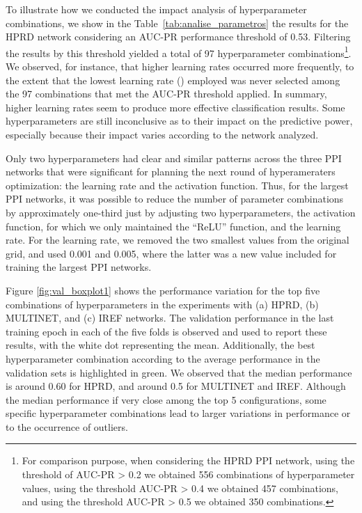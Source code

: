 To illustrate how we conducted the impact analysis of hyperparameter combinations, we show in the  Table~\ref{tab:analise_parametros} the results for the HPRD network considering an AUC-PR performance threshold of 0.53. Filtering the results by this threshold yielded a total of 97 hyperparameter combinations\footnote{For comparison purpose, when considering the HPRD PPI network, using the threshold of AUC-PR > 0.2 we obtained 556 combinations of hyperparameter values, using the threshold AUC-PR > 0.4 we obtained 457 combinations, and using the threshold AUC-PR > 0.5 we obtained 350 combinations.}.  We observed, for instance, that higher learning rates occurred more frequently, to the extent that the lowest learning rate () employed was never selected among the 97 combinations that met the AUC-PR threshold applied. 
In summary, higher learning rates seem to produce more effective classification results. Some hyperparameters are still inconclusive as to their impact on the predictive power, especially because their impact varies according to the network analyzed. 

Only two hyperparameters had clear and similar patterns across the three PPI networks that were significant for planning the next round of hyperameraters optimization: the learning rate and the activation function.  Thus, for the largest PPI networks, it was possible to reduce the number of parameter combinations by approximately one-third just by adjusting two hyperparameters, the activation function, for which we only maintained the ``ReLU'' function, and the learning rate. For the learning rate, we removed the two smallest values from the original grid, and used 0.001 and 0.005, where the latter was a new value included for training the largest PPI networks.


Figure \ref{fig:val_boxplot1} shows the performance variation for the top five combinations of hyperparameters in the experiments with (a) HPRD, (b) MULTINET, and (c) IREF networks. The validation performance in the last training epoch in each of the five folds is observed and used to report these results, with the white dot representing the mean. Additionally, the best hyperparameter combination according to the average performance in the validation sets is highlighted in green. We observed that the median performance is around 0.60 for HPRD, and around 0.5 for MULTINET and IREF. Although the median performance if very close among the top 5 configurations, some specific hyperparameter combinations lead to larger variations in performance or to the occurrence of outliers.


